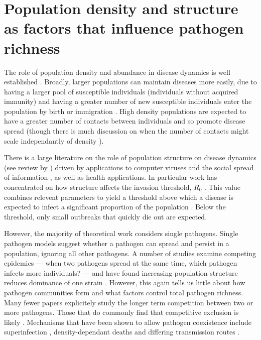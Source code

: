 \section{Population density and structure as factors that influence pathogen richness}




The role of population density and abundance in disease dynamics is well established \cite{may1979population, anderson1979population, heesterbeek2002brief, lloyd2005should}.
Broadly, larger populations can maintain diseases more easily, due to having a larger pool of susceptible individuals (individuals without acquired immunity) and having a greater number of new susceptible individuals enter the population by birth or immigration \cite{may1979population, anderson1979population}.
High density populations are expected to have a greater number of contacts between individuals and so promote disease spread (though there is much discussion on when the number of contacts might scale independantly of density \cite{mccallum2001should}).


There is a large literature on the role of population structure on disease dynamics (see review by \textcite{pastor2015epidemic}) driven by applications to computer viruses \cite{pastor2001epidemic} and the social spread of information \cite{daley1964epidemics, goffman1964generalization}, as well as health applications.
In particular work has concentrated on how structure affects the invasion threshold, $R_0$ \cite{colizza2007invasion, barthelemy2010fluctuation, wu2013threshold, may2001infection, pastor2001epidemic}. 
This value combines relevent parameters to yield a threshold above which a disease is expected to infect a significant proportion of the population \cite{may1979population, anderson1979population}.
Below the threshold, only small outbreaks that quickly die out are expected.

However, the majority of theoretical work considers single pathogens.
Single pathogen models suggest whether a pathogen can spread and persist in a population, ignoring all other pathogens.
A number of studies examine competing epidemics --- when two pathogens spread at the same time, which pathogen infects more individuals? --- and have found increasing population structure reduces dominance of one strain \cite{van2014domination, poletto2013host, poletto2015characterising}.
However, this again tells us little about how pathogen communities form and what factors control total pathogen richness.
Many fewer papers explicitely study the longer term competition between two or more pathogens.
Those that do commonly find that competitive exclusion is likely \cite{castillo1995dynamics, bremermann1989competitive, martcheva2013competitive, ackleh2003competitive, ackleh2014robust, turner2002impact}.
Mechanisms that have been shown to allow pathogen coexistence include superinfection \cite{may1994superinfection, li2010age}, density-dependant deaths \cite{ackleh2003competitive, kirupaharan2004coexistence} and differing transmission routes \cite{allen2003dynamics}.

